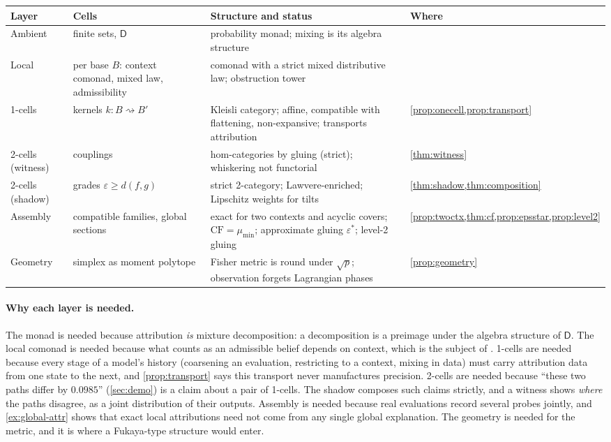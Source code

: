\documentclass[11pt]{article}
\theoremstyle{definition}
\theoremstyle{remark}
\newcommand{\D}{\mathsf{D}}
\begin{document}
\begin{center}\small
\begin{tabular}{@{}R{0.13\textwidth}R{0.24\textwidth}R{0.37\textwidth}R{0.17\textwidth}@{}}
\toprule
Layer & Cells & Structure and status & Where\\
\midrule
Ambient & finite sets, $\D$ & probability monad; mixing is its algebra structure & \cite{Awasthi-Tower}\\
Local & per base $B$: context comonad, mixed law, admissibility & comonad with a strict mixed
distributive law; obstruction tower & \cite[\S\S9--10]{Awasthi-Tower}\\
1-cells & kernels $k\colon B\rightsquigarrow B'$ & Kleisli category; affine, compatible with flattening,
non-expansive; transports attribution & \cref{prop:onecell,prop:transport}\\
2-cells (witness) & couplings & hom-categories by gluing (strict); whiskering not functorial &
\cref{thm:witness}\\
2-cells (shadow) & grades $\varepsilon\ge d(f,g)$ & strict 2-category; Lawvere-enriched; Lipschitz
weights for tilts & \cref{thm:shadow,thm:composition}\\
Assembly & compatible families, global sections & exact for two contexts and acyclic covers;
$\mathrm{CF}=\mu_{\min}$; approximate gluing $\varepsilon^*$; level-2 gluing &
\cref{prop:twoctx,thm:cf,prop:epsstar,prop:level2}\\
Geometry & simplex as moment polytope & Fisher metric is round under $\sqrt p$; observation forgets
Lagrangian phases & \cref{prop:geometry}\\
\bottomrule
\end{tabular}
\end{center}

\paragraph{Why each layer is needed.} The monad is needed because attribution \emph{is} mixture
decomposition: a decomposition is a preimage under the algebra structure of $\D$. The local comonad
is needed because what counts as an admissible belief depends on context, which is the subject of
\cite{Awasthi-Tower}. 1-cells are needed because every stage of a model's history (coarsening an
evaluation, restricting to a context, mixing in data) must carry attribution data from one state to
the next, and \cref{prop:transport} says this transport never manufactures precision. 2-cells are
needed because ``these two paths differ by $0.0985$'' (\cref{sec:demo}) is a claim about a pair of
1-cells. The shadow composes such claims strictly, and a witness shows \emph{where} the paths
disagree, as a joint distribution of their outputs. Assembly is needed because real evaluations
record several probes jointly, and \cref{ex:global-attr} shows that exact local attributions need not
come from any single global explanation. The geometry is needed for the metric, and it is where a
Fukaya-type structure would enter.
\end{document}
